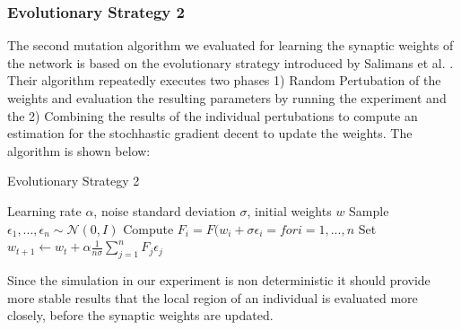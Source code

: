 \subsubsection{Evolutionary Strategy 2}
The second mutation algorithm we evaluated for learning the synaptic weights of the network is based on the evolutionary strategy introduced by Salimans et al. \cite{Salimans2017EvolutionSA}. Their algorithm repeatedly executes two phases 1) Random Pertubation of the weights and evaluation the resulting parameters by running the experiment and the 2) Combining the results of the individual pertubations to compute an estimation for the stochhastic gradient decent to update the weights. The algorithm is shown below: 
\begin{algorithm}
	\caption{Evolutionary Strategy 2}
	\begin{algorithmic}[1]
		\renewcommand{\algorithmicrequire}{\textbf{Input:}}
		\REQUIRE Learning rate $\alpha$, noise standard deviation $\sigma$, initial weights $w$
		\STATE Sample $\epsilon_{1},...,\epsilon_{n} \sim \mathcal{N}\left( 0, I \right)$
		\STATE Compute $F_{ i } = F(w_{ i } + \sigma \epsilon_{ i }= for i = 1, ..., n$
		\STATE Set $w_{ t+1 } \leftarrow  w_{ t }+ \alpha \frac{ 1 }{ n \sigma } \sum_{ j = 1 }^{ n }{F_{ j } \epsilon_{ j }  }$
		\ENDFOR
	\end{algorithmic} 
\end{algorithm}

Since the simulation in our experiment is non deterministic it should provide more stable results that the local region of an individual is evaluated more closely, before the synaptic weights are updated.
